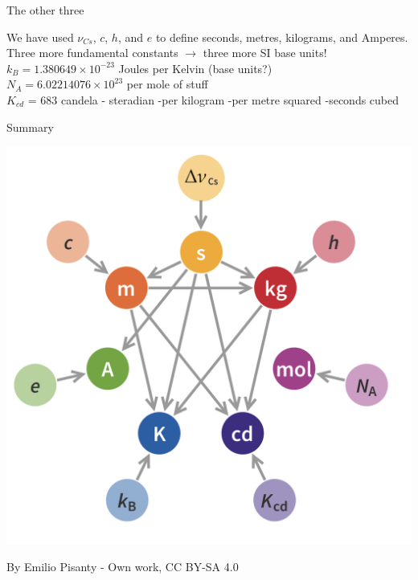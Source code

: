 \begin{frame}{The other three}
\small

We have used  $\nu_{Cs}$, $c$, $h$, and $e$ to define seconds, metres, kilograms, and Amperes.\\[2ex]

Three more fundamental constants $\rightarrow$ three more SI base units!\\[2ex]

$k_{B} = 1.380649\times10^{-23} $ Joules per Kelvin (base units?)\\[2ex]

$N_{A} = 6.02214076\times10^{23}$ per mole of stuff\\[2ex]

$K_{cd}$ = 683  candela - steradian -per kilogram -per metre squared -seconds cubed\\[2ex]



\end{frame}


\begin{frame}{Summary}
%
%
%
\begin{center}
\includegraphics[scale=0.3]{SInew}
\end{center}
\tiny
By Emilio Pisanty - Own work, CC BY-SA 4.0
\end{frame}

